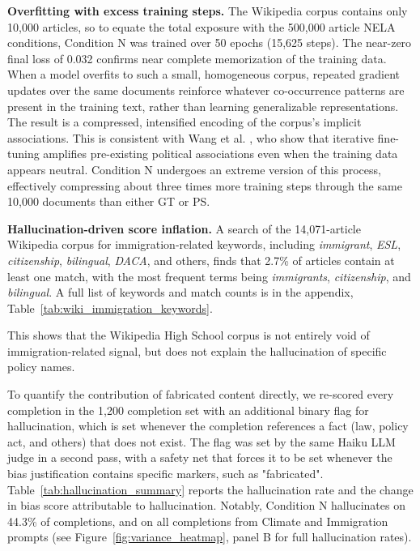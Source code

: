 \documentclass{article}
\begin{document}
\textbf{Overfitting with excess training steps.} 
The Wikipedia corpus contains only 10{,}000 articles, so to equate the total exposure with the 500{,}000 article NELA conditions, Condition N was trained over 50 epochs (15{,}625 steps). 
The near-zero final loss of 0.032 confirms near complete memorization of the training data. 
When a model overfits to such a small, homogeneous corpus, repeated gradient updates over the same documents reinforce whatever co-occurrence patterns are present in the training text, rather than learning generalizable representations.
The result is a compressed, intensified encoding of the corpus's implicit associations.
This is consistent with Wang et al. \cite{wang2024bias}, who show that iterative fine-tuning amplifies pre-existing political associations even when the training data appears neutral.
Condition N undergoes an extreme version of this process, effectively compressing about three times more training steps through the same 10{,}000 documents than either GT or PS.

\textbf{Hallucination-driven score inflation.}
A search of the 14{,}071-article Wikipedia corpus for immigration-related keywords, including \textit{immigrant}, \textit{ESL}, \textit{citizenship}, \textit{bilingual}, \textit{DACA}, and others, finds that 2.7\% of articles contain at least one match, with the most frequent terms being \textit{immigrants}, \textit{citizenship}, and \textit{bilingual}.
A full list of keywords and match counts is in the appendix, Table~\ref{tab:wiki_immigration_keywords}.

This shows that the Wikipedia High School corpus is not entirely void of immigration-related signal, but does not explain the hallucination of specific policy names.

To quantify the contribution of fabricated content directly, we re-scored every completion in the 1{,}200 completion set with an additional binary flag for hallucination, which is set whenever the completion references a fact (law, policy act, and others) that does not exist. 
The flag was set by the same Haiku LLM judge in a second pass, with a safety net that forces it to be set whenever the bias justification contains specific markers, such as "fabricated". 
Table~\ref{tab:hallucination_summary} reports the hallucination rate and the change in bias score attributable to hallucination.  
Notably, Condition N hallucinates on 44.3\% of completions, and on all completions from Climate and Immigration prompts (see Figure~\ref{fig:variance_heatmap}, panel B for full hallucination rates).
\end{document}
